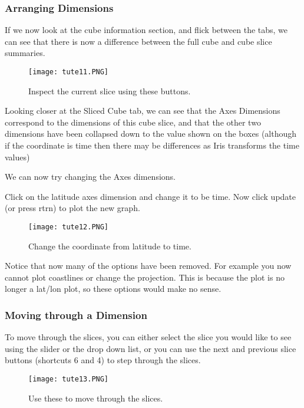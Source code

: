 \documentclass[a4paper,12pt]{article}
\begin{document}
\subsubsection{Arranging Dimensions}

If we now look at the cube information section, and flick between the tabs, we
can see that there is now a difference between the full cube and cube slice
summaries.

\begin{figure}[H]
\centering
\texttt{[image: tute11.PNG]}
\caption{Inspect the current slice using these buttons.}
\label{overflow}
\end{figure}


Looking closer at the Sliced Cube tab, we can see that the Axes Dimensions
correspond to the dimensions of this cube slice, and that the other two
dimensions have been collapsed down to the value shown on the boxes (although
if the coordinate is time then there may be differences as Iris transforms
the time values)

We can now try changing the Axes dimensions.

Click on the latitude axes dimension and change it to be time.
Now click update (or press rtrn) to plot the new graph.

\begin{figure}[H]
\centering
\texttt{[image: tute12.PNG]}
\caption{Change the coordinate from latitude to time.}
\label{overflow}
\end{figure}


Notice that now many of the options have been removed. For example you now
cannot plot coastlines or change the projection. This is because the plot is
no longer a lat/lon plot, so these options would make no sense.

\subsubsection{Moving through a Dimension}

To move through the slices, you can either select the slice you would like to
see using the slider or the drop down list, or you can use the next and previous
slice buttons (shortcuts 6 and 4) to step through the slices.

\begin{figure}[H]
\centering
\texttt{[image: tute13.PNG]}
\caption{Use these to move through the slices.}
\label{overflow}
\end{figure}
\end{document}
